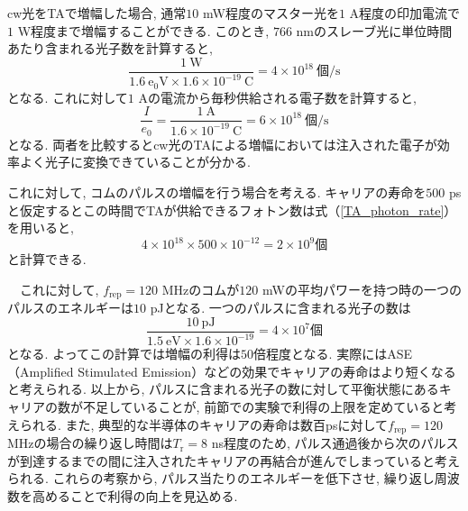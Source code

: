 \documentclass[uplatex, dvipdfmx, a4paper, report, papersize, 11pt]{jsbook}
\begin{document}
cw光をTAで増幅した場合, 通常$10$ mW程度のマスター光を$1$ A程度の印加電流で$1$ W程度まで増幅することができる. このとき, $766$ nmのスレーブ光に単位時間あたり含まれる光子数を計算すると,
\begin{equation}\label{TA_photon_rate}
  \frac{1\ \mathrm{W}}{1.6\ \mathrm{e_0V}\times1.6\times10^{-19}\ \mathrm{C}} = 4\times10^{18}\ 個\mathrm{/s}
\end{equation}
となる. これに対して$1$ Aの電流から毎秒供給される電子数を計算すると,
\begin{equation}
  \frac{I}{e_0} = \frac{1\ \mathrm{A}}{1.6\times10^{-19}\ \mathrm{C}} = 6\times10^{18}\ 個\mathrm{/s}
\end{equation}
となる. 両者を比較するとcw光のTAによる増幅においては注入された電子が効率よく光子に変換できていることが分かる. \par
これに対して, コムのパルスの増幅を行う場合を考える. キャリアの寿命を$500$ psと仮定するとこの時間でTAが供給できるフォトン数は式（\ref{TA_photon_rate}）を用いると,
\begin{equation}
  4\times10^{18}\times500\times10^{-12} = 2\times10^9 個
\end{equation}
と計算できる. \par
　これに対して, $f_{\mathrm{rep}} = 120$ MHzのコムが$120$ mWの平均パワーを持つ時の一つのパルスのエネルギーは$10$ pJとなる. 一つのパルスに含まれる光子の数は
\begin{equation}
  \frac{10\ \mathrm{pJ}}{1.5\ \mathrm{eV}\times1.6\times10^{-19}} = 4\times10^7 個
\end{equation}
となる. よってこの計算では増幅の利得は$50$倍程度となる. 実際にはASE（Amplified Stimulated Emission）などの効果でキャリアの寿命はより短くなると考えられる. 以上から, パルスに含まれる光子の数に対して平衡状態にあるキャリアの数が不足していることが, 前節での実験で利得の上限を定めていると考えられる. また, 典型的な半導体のキャリアの寿命は数百psに対して$f_{\mathrm{rep}} = 120$ MHzの場合の繰り返し時間は$T_\mathrm{r} = 8$ ns程度のため, パルス通過後から次のパルスが到達するまでの間に注入されたキャリアの再結合が進んでしまっていると考えられる. これらの考察から, パルス当たりのエネルギーを低下させ, 繰り返し周波数を高めることで利得の向上を見込める.
\end{document}
